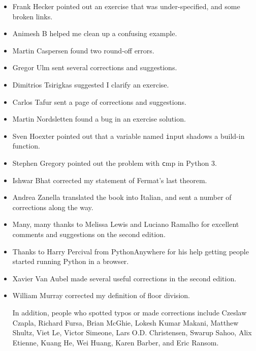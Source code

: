 \documentclass[
DIV=11,
fontsize=13,
twoside,
headinclude=false,
titlepage=firstiscover,
abstract=true,
headsepline=true,
footsepline=true,
chapterprefix=true, %
headings=big,
bibliography=totoc,%
captions=tableheading
]{scrbook}
\theoremstyle{definition}
\begin{document}
\begin{itemize}
\item Frank Hecker pointed out an exercise that was under-specified, and
some broken links.

\item Animesh B helped me clean up a confusing example.

\item Martin Caspersen found two round-off errors.

\item Gregor Ulm sent several corrections and suggestions.

\item Dimitrios Tsirigkas suggested I clarify an exercise.

\item Carlos Tafur sent a page of corrections and suggestions.

\item Martin Nordsletten found a bug in an exercise solution.

\item Sven Hoexter pointed out that a variable named {\texttt input}
shadows a build-in function.

\item Stephen Gregory pointed out the problem with {\texttt cmp}
in Python 3.

\item Ishwar Bhat corrected my statement of Fermat's last theorem.

\item Andrea Zanella translated the book into Italian, and sent a
number of corrections along the way.

\item Many, many thanks to Melissa Lewis and Luciano Ramalho for
  excellent comments and suggestions on the second edition.

\item Thanks to Harry Percival from PythonAnywhere for his help
getting people started running Python in a browser.

\item Xavier Van Aubel made several useful corrections in the second
edition.

\item William Murray corrected my definition of floor division.


In addition, people who spotted typos or made corrections include
Czeslaw Czapla,
Richard Fursa, Brian McGhie, Lokesh Kumar Makani, Matthew Shultz, Viet
Le, Victor Simeone, Lars O.D. Christensen, Swarup Sahoo, Alix Etienne,
Kuang He, Wei Huang, Karen Barber, and Eric Ransom.




\end{itemize}
\end{document}
